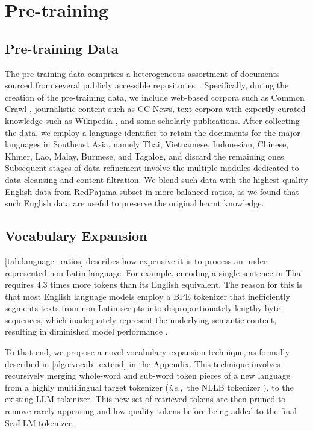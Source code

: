 \section{Pre-training}\label{sec:pretraining}

\subsection{Pre-training Data}\label{sec:pretrain:data}

The pre-training data comprises a heterogeneous assortment of documents sourced from several publicly accessible repositories~\citep{suarez2019asynchronous,mc4_2019t5,together2023redpajama,wikidump}. Specifically, during the creation of the pre-training data, we include web-based corpora such as Common Crawl \citep{ccnet_wenzek-etal-2020-ccnet}, journalistic content such as CC-News, text corpora with expertly-curated knowledge such as Wikipedia \citep{wikidump}, and some scholarly publications. After collecting the data, we employ a language identifier \citep{fasttext} to retain the documents for the major languages in Southeast Asia, namely Thai, Vietnamese, Indonesian, Chinese, Khmer, Lao, Malay, Burmese, and Tagalog, and discard the remaining ones. Subsequent stages of data refinement involve the multiple modules dedicated to data cleansing and content filtration. We blend such data with the highest quality English data from RedPajama subset \citep{together2023redpajama} in more balanced ratios, as we found that such English data are useful to preserve the original learnt knowledge.

\subsection{Vocabulary Expansion}\label{sec:pretrain:vocab_extend}

\ref{tab:language_ratios} describes how expensive it is to process an under-represented non-Latin language. For example, encoding a single sentence in Thai requires 4.3 times more tokens than its English equivalent. The reason for this is that most English language models employ a BPE tokenizer \citep{bpe_sennrich2015neural} that inefficiently segments texts from non-Latin scripts into disproportionately lengthy byte sequences, which inadequately represent the underlying semantic content, resulting in diminished model performance \citep{democratize_llm_ldp_nguyen2023}. 

To that end, we propose a novel vocabulary expansion technique, as formally described in \ref{algo:vocab_extend} in the Appendix. This technique involves recursively merging whole-word and sub-word token pieces of a new language from a highly multilingual target tokenizer (\emph{i.e.,}\ the NLLB tokenizer \citep{nllb_costa2022no_flores200}), to the existing LLM tokenizer. This new set of retrieved tokens are then pruned to remove rarely appearing and low-quality tokens before being added to the final SeaLLM tokenizer. 

